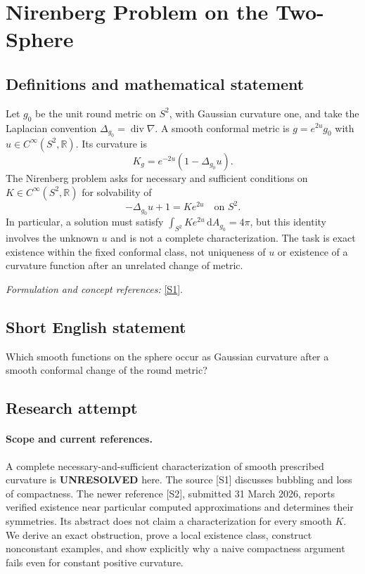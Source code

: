 \documentclass[11pt]{article}
\begin{document}
\section*{\texorpdfstring{Nirenberg Problem on the Two-Sphere}{Nirenberg Problem on the Two-Sphere}}\label{328}
\subsection{Definitions and mathematical statement}
Let $g_0$ be the unit round metric on $S^2$, with Gaussian curvature one, and take the Laplacian convention $\Delta_{g_0}=\operatorname{div}\nabla$. A smooth conformal metric is $g=e^{2u}g_0$ with $u\in C^\infty(S^2,{\mathbb{R}})$. Its curvature is
\[
 K_g=e^{-2u}(1-\Delta_{g_0}u).
\]
The Nirenberg problem asks for necessary and sufficient conditions on $K\in C^\infty(S^2,{\mathbb{R}})$ for solvability of
\[
 -\Delta_{g_0}u+1=K e^{2u}\quad\text{on }S^2.
\]
In particular, a solution must satisfy $\int_{S^2}K e^{2u}{\,\mathrm{d}} A_{g_0}=4\pi$, but this identity involves the unknown $u$ and is not a complete characterization. The task is exact existence within the fixed conformal class, not uniqueness of $u$ or existence of a curvature function after an unrelated change of metric.
\par\smallskip\textit{Formulation and concept references:} \href{https://link.springer.com/article/10.1007/s00032-022-00370-1}{[S1]}.

\subsection{Short English statement}
Which smooth functions on the sphere occur as Gaussian curvature after a smooth conformal change of the round metric?
\subsection{Research attempt}
\paragraph{Scope and current references.}
A complete necessary-and-sufficient characterization of smooth
prescribed curvature is \textbf{UNRESOLVED} here. The source [S1]
discusses bubbling and loss of compactness. The newer reference [S2],
submitted 31 March 2026, reports verified existence near particular
computed approximations and determines their symmetries. Its abstract
does not claim a characterization for every smooth $K$. We derive
an exact obstruction, prove a local existence class, construct
nonconstant examples, and show explicitly why a naive compactness
argument fails even for constant positive curvature.
\end{document}
